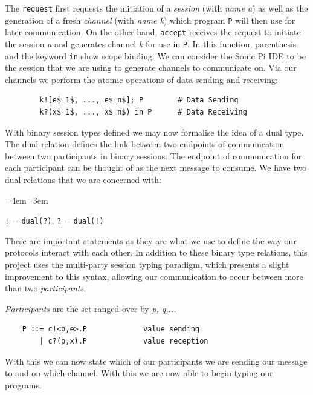 \documentclass[11pt, abstracton, twoside, titlepage=true]{scrartcl}
\newenvironment{blockquote}{
	\par
	\medskip
	\leftskip=4em\rightskip=3em
	\noindent\ignorespaces
}{
	\par\medskip
}
\begin{document}
The \texttt{request} first requests the initiation of a \emph{session} (with 
\emph{name a}) as well as the generation of a fresh \emph{channel} (with 
\emph{name k}) which program \texttt{P} will then use for later communication. 
On the other hand, \texttt{accept} receives the request to initiate the session 
\emph{a} and generates channel \emph{k} for use in \texttt{P}. In this function, 
parenthesis and the keyword \texttt{in} show scope binding. We can consider the 
Sonic Pi IDE to be the session that we are using to generate channels to communicate 
on. Via our channels we perform the atomic operations of data sending and receiving:
\\
\begin{lstlisting}
        k![e$_1$, ..., e$_n$]; P        # Data Sending  
        k?(x$_1$, ..., x$_n$) in P      # Data Receiving
\end{lstlisting}

With binary session types defined we may now formalise the idea of a dual type. The 
dual relation defines the link between two endpoints of communication between two 
participants in binary sessions. The endpoint of communication for each participant 
can be thought of as the next message to consume. We have two dual 
relations that we are concerned with: 

\begin{blockquote}
	\texttt{!} = \texttt{dual(?)}, \texttt{?} = \texttt{dual(!)}
\end{blockquote}

These are important statements as they are what we use to define the way our protocols 
interact with each other. In addition to these binary type relations, this project 
uses the multi-party session typing paradigm, which presents a slight
improvement to this syntax, allowing our communication to occur between more
than two \emph{participants}. 

\emph{Participants} are the set ranged over by 
\emph{p, q,...}
\\
\begin{lstlisting}
    P ::= c!<p,e>.P             value sending
        | c?(p,x).P             value reception
\end{lstlisting}

With this we can now state which of our participants we are sending our message
to and on which channel. With this we are now able to begin typing our programs.
\end{document}
